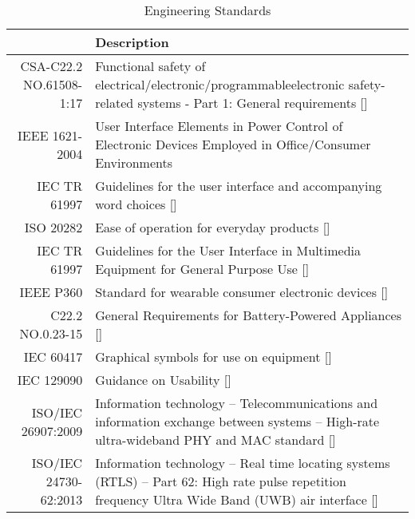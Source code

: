\def\arraystretch{1.5}
\begin{table}[H]
\centering
\begin{tabular}{ | p{3.5cm} | p{11.5cm}| } 
\hline
\rowcolor{lightgray} \multicolumn{1}{|r|}{\textbf{Standard Code}} & \textbf{Description}\\ 
\hline
\multicolumn{1}{|r|}{CSA-C22.2 NO.61508-1:17} & Functional safety of electrical/electronic/programmableelectronic safety-related systems - Part 1: General requirements []\\ 
\hline
\multicolumn{1}{|r|}{IEEE 1621-2004} & User Interface Elements in Power Control of Electronic Devices Employed in Office/Consumer Environments \\ 
\hline
\multicolumn{1}{|r|}{IEC TR 61997} & Guidelines for the user interface and accompanying word choices [] \\ 
\hline
\multicolumn{1}{|r|}{ISO 20282} & Ease of operation for everyday products [] \\ 
\hline
\multicolumn{1}{|r|}{IEC TR 61997} & Guidelines for the User Interface in Multimedia Equipment for General Purpose Use [] \\ 
\hline
\multicolumn{1}{|r|}{IEEE P360} & Standard for wearable consumer electronic devices []\\ 
\hline
\multicolumn{1}{|r|}{C22.2 NO.0.23-15} & General Requirements for Battery-Powered Appliances []\\ 
\hline
\multicolumn{1}{|r|}{IEC 60417} & Graphical symbols for use on equipment []\\ 
\hline
\multicolumn{1}{|r|}{IEC 129090} & Guidance on Usability []\\ 
\hline
\multicolumn{1}{|r|}{ISO/IEC 26907:2009} & Information technology -- Telecommunications and information exchange between systems -- High-rate ultra-wideband PHY and MAC standard [] \\
\hline
\multicolumn{1}{|r|}{ISO/IEC 24730-62:2013} & Information technology -- Real time locating systems (RTLS) -- Part 62: High rate pulse repetition frequency Ultra Wide Band (UWB) air interface []\\ 
\hline
\end{tabular}
\caption{Engineering Standards}
\end{table}	









